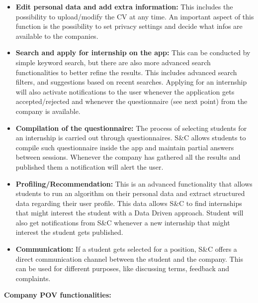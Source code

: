 \begin{itemize}
    \item \textbf{Edit personal data and add extra information:} This includes the possibility to upload/modify the CV at any time. An important aspect of this function is the possibility to set privacy settings and decide what infos are available to the companies.
    \item \textbf{Search and apply for internship on the app:} This can be conducted by simple keyword search, but there are also more advanced search functionalities to better refine the results. This includes advanced search filters, and suggestions based on recent searches. Applying for an internship will also activate notifications to the user whenever the application gets accepted/rejected and whenever the questionnaire (see next point) from the company is available.
    \item \textbf{Compilation of the questionnaire:} The process of selecting students for an internship is carried out through questionnaires. S\&C allows students to compile such questionnaire inside the app and maintain partial answers between sessions. Whenever the company has gathered all the results and published them a notification will alert the user.
    \item \textbf{Profiling/Recommendation:} This is an advanced functionality that allows students to run an algorithm on their personal data and extract structured data regarding their user profile. This data allows S\&C to find internships that might interest the student with a Data Driven approach. Student will also get notifications from S\&C whenever a new internship that might interest the student gets published.
    \item \textbf{Communication:} If a student gets selected for a position, S\&C offers a direct communication channel between the student and the company. This can be used for different purposes, like discussing terms, feedback and complaints.
\end{itemize}

\par\textbf{Company POV functionalities:}

